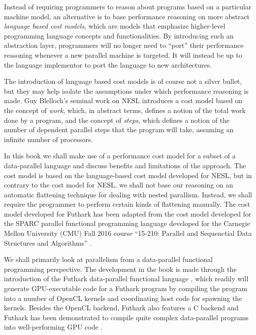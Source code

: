 \documentclass[oneside,11pt]{book}
\begin{document}
Instead of requiring programmers to reason about programs based on a
particular machine model, an alternative is to base performance
reasoning on more abstract \emph{language based cost models}, which
are models that emphasize higher-level programming language concepts and
functionalities. By introducing such an abstraction layer, programmers will
no longer need to ``port'' their performance reasoning whenever a new
parallel machine is targeted. It will instead be up to the language
implementor to port the language to new architectures.

The introduction of language based cost models is of course not a
silver bullet, but they may help isolate the assumptions under which
performance reasoning is made. Guy Blelloch's seminal work on NESL
\cite{blelloch1990vector,blelloch1994implementation} introduces a cost
model based on the concept of \emph{work}, which, in abstract terms,
defines a notion of the total work done by a program, and the concept
of \emph{steps}, which defines a notion of the number of dependent
parallel steps that the program will take, assuming an infinite number
of processors.

In this book we shall make use of a performance cost model for a
subset of a data-parallel language and discuss benefits and
limitations of the approach. The cost model is based on the
language-based cost model developed for NESL, but in contrary to the
cost model for NESL, we shall not base our reasoning on an automatic
flattening technique for dealing with nested parallism. Instead, we
shall require the programmer to perform certain kinds of flattening
manually. The cost model developed for Futhark has been adapted from
the cost model developed for the SPARC parallel functional programming
language developed for the Carnegie Mellon University (CMU) Fall 2016
course ``15-210: Parallel and Sequenctial Data Structures and
Algorithms'' \cite{algdesign:parseq2016}.

We shall primarily look at parallelism from a data-parallel functional
programming perspective. The development in the book is made through
the introduction of the Futhark data-parallel functional language
\cite{henriksen2014size,henriksen2016design,henriksen2014bounds,henriksen2013t2},
which readily will generate GPU-executable code for a Futhark program
by compiling the program into a number of OpenCL kernels and
coordinating host code for spawning the kernels. Besides the OpenCL
backend, Futhark also features a C backend and Futhark has been
demonstrated to compile quite complex data-parallel programs into
well-performing GPU code \cite{finpar,apltofuthark2016}.
\end{document}
